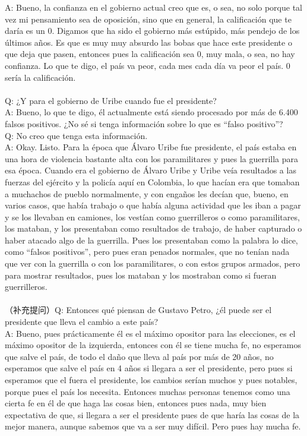 \documentclass{phyasgn}\usepackage{nag}
\begin{document}
A: Bueno, la confianza en el gobierno actual creo que es, o sea, no solo porque tal vez mi pensamiento sea de oposición, sino que en general, la calificación que te daría es un 0. Digamos que ha sido el gobierno más estúpido, más pendejo de los últimos años. Es que es muy muy absurdo las bobas que hace este presidente o que deja que pasen, entonces pues la calificación sea 0, muy mala, o sea, no hay confianza. Lo que te digo, el país va peor, cada mes cada día va peor el país. 0 sería la calificación.\\
\\
Q: ¿Y para el gobierno de Uribe cuando fue el presidente?\\
A: Bueno, lo que te digo, él actualmente está siendo procesado por más de 6.400 falsos positivos. ¿No sé si tenga información sobre lo que es “falso positivo”?\\
Q: No creo que tenga esta información.\\
A: Okay. Listo. Para la época que Álvaro Uribe fue presidente, el país estaba en una hora de violencia bastante alta con los paramilitares y pues la guerrilla para esa época. Cuando era el gobierno de Álvaro Uribe y Uribe veía resultados a las fuerzas del ejército y la policía aquí en Colombia, lo que hacían era que tomaban a muchachos de pueblo normalmente, y con engaños les decían que, bueno, en varios casos, que había trabajo o que había alguna actividad que les iban a pagar y se los llevaban en camiones, los vestían como guerrilleros o como paramilitares, los mataban, y los presentaban como resultados de trabajo, de haber capturado o haber atacado algo de la guerrilla. Pues los presentaban como la palabra lo dice, como “falsos positivos”, pero pues eran penados normales, que no tenían nada que ver con la guerrilla o con los paramilitares, o con estos grupos armados, pero para mostrar resultados, pues los mataban y los mostraban como si fueran guerrilleros. \\
\\
（补充提问）Q: Entonces qué piensan de Gustavo Petro, ¿él puede ser el presidente que lleva el cambio a este país?\\
A: Bueno, pues prácticamente él es el máximo opositor para las elecciones, es el máximo opositor de la izquierda, entonces con él se tiene mucha fe, no esperamos que salve el país, de todo el daño que lleva al país por más de 20 años, no esperamos que salve el país en 4 años si llegara a ser el presidente, pero pues si esperamos que el fuera el presidente, los cambios serían muchos y pues notables, porque pues el país los necesita. Entonces muchas personas tenemos como una cierta fe en él de que haga las cosas bien, entonces pues nada, muy bien expectativa de que, si llegara a ser el presidente pues de que haría las cosas de la mejor manera, aunque sabemos que va a ser muy difícil. Pero pues hay mucha fe. \\
\end{document}
